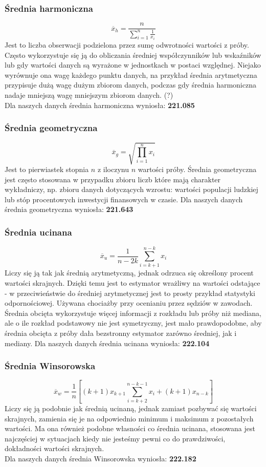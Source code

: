 \documentclass{article}
\theoremstyle{break}
\begin{document}
	\subsubsection*{Średnia harmoniczna}
	$$\overline{x}_h=\frac{n}{\sum\limits_{i=1}^{n}\frac{1}{x_i}}$$
	Jest to liczba obserwacji podzielona przez sumę odwrotności wartości z próby. Często wykorzystuje się ją do obliczania średniej współczynników lub wskaźników lub gdy wartości danych są wyrażone w jednostkach w postaci względnej. Niejako wyrównuje ona wagę każdego punktu danych, na przykład średnia arytmetyczna przypisuje dużą wagę dużym zbiorom danych, podczas gdy średnia harmoniczna nadaje mniejszą wagę mniejszym zbiorom danych. (?) \\
	Dla naszych danych średnia harmoniczna wyniosła: \textbf{221.085}
	\subsubsection*{Średnia geometryczna}
	$$\overline{x}_g=\sqrt{\prod\limits_{i=1}^{n}x_i}$$
	Jest to pierwiastek stopnia $n$ z iloczynu $n$ wartości próby. Średnia geometryczna jest często stosowana w przypadku zbioru liczb które mają charakter wykładniczy, np. zbioru danych dotyczących wzrostu: wartości populacji ludzkiej lub stóp procentowych inwestycji finansowych w czasie.
	Dla naszych danych średnia geometryczna wyniosła: \textbf{221.643}
	\subsubsection*{Średnia ucinana}
	$$\overline{x}_u=\frac{1}{n-2k}\sum\limits_{i=k+1}^{n-k}x_i$$
	Liczy się ją tak jak średnią arytmetyczną, jednak odrzuca się określony procent wartości skrajnych. Dzięki temu jest to estymator wrażliwy na wartości odstające - w przeciwieństwie do średniej arytmetycznej jest to prosty przykład statystyki odpornościowej. Używana chociażby przy ocenianiu przez sędziów w zawodach. Średnia obcięta wykorzystuje więcej informacji z rozkładu lub próby niż mediana, ale o ile rozkład podstawowy nie jest symetryczny, jest mało prawdopodobne, aby średnia obcięta z próby dała bezstronny estymator zarówno średniej, jak i mediany.
	Dla naszych danych średnia ucinana wyniosła: \textbf{222.104}
	\subsubsection*{Średnia Winsorowska}
	$$\overline{x}_w=\frac{1}{n}[(k+1)x_{k+1}\sum\limits_{i=k+2}^{n-k-1}x_i +(k+1)x_{n-k}]$$
	Liczy się ją podobnie jak średnią ucinaną, jednak zamiast pozbywać się wartości skrajnych, zamienia się je na odpowiednio minimum i maksimum z pozostałych wartości. Ma ona również podobne własności co średnia ucinana, stosowana jest najczęściej w sytuacjach kiedy nie jesteśmy pewni co do prawdziwości, dokładności wartości skrajnych.
	\\Dla naszych danych średnia Winsorowska wyniosła: \textbf{222.182}
\end{document}
